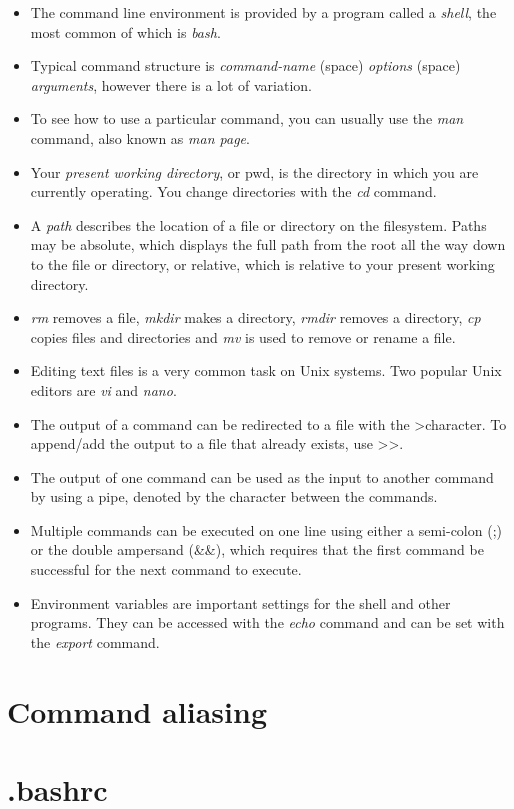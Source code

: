 \begin{itemize}
\item The command line environment is provided by a program called a \textit{shell}, the most common of which is \textit{bash}.
\item Typical command structure is \textit{command-name} (space) \textit{options} (space) \textit{arguments}, however there is a lot of variation.
\item To see how to use a particular command, you can usually use the \textit{man} command, also known as \textit{man page}.
\item Your \textit{present working directory}, or pwd, is the directory in which you are currently operating.  You change directories with the \textit{cd} command.
\item A \textit{path} describes the location of a file or directory on the filesystem.  Paths may be absolute, which displays the full path from the root all the way down to the file or directory, or relative, which is relative to your present working directory.
\item \textit{rm} removes a file, \textit{mkdir} makes a directory, \textit{rmdir} removes a directory, \textit{cp} copies files and directories and \textit{mv} is used to remove or rename a file.
\item Editing text files is a very common task on Unix systems.  Two popular Unix editors are \textit{vi} and \textit{nano}.
\item The output of a command can be redirected to a file with the \textgreater character.  To append/add the output to a file that already exists, use \textgreater\textgreater.
\item The output of one command can be used as the input to another command by using a pipe, denoted by the \textbar character between the commands.
\item Multiple commands can be executed on one line using either a semi-colon (;) or the double ampersand (\&\&), which requires that the first command be successful for the next command to execute.
\item Environment variables are important settings for the shell and other programs.  They can be accessed with the \textit{echo} command and can be set with the \textit{export} command.
\end{itemize}

\section{Command aliasing}

\section{.bashrc}
